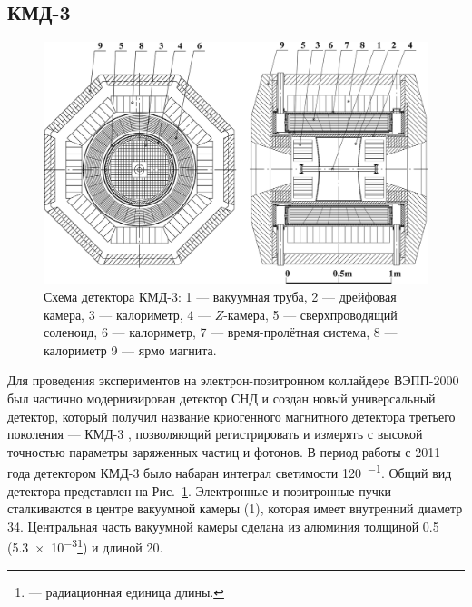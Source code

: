 \subsection{КМД-3}
\label{sec:cmd3}

\begin{figure}[htbp]
    \centering
    \includegraphics[width = .9\textwidth]{img/cmd3_detector/cmd3_layout.jpeg}
    \caption{Схема детектора КМД-3:
    	1 --- вакуумная труба,
    	2 --- дрейфовая камера,
    	3 ---  калориметр,
    	4 --- $Z$-камера,
    	5 --- сверхпроводящий соленоид,
    	6 ---  калориметр,
    	7 --- время-пролётная система,
    	8 ---  калориметр
    	9 --- ярмо магнита.
    }
    \label{fig:cmd3}
\end{figure}


Для проведения экспериментов на электрон-позитронном коллайдере \mbox{ВЭПП-2000} был частично модернизирован детектор СНД и создан новый универсальный детектор,
который получил название криогенного магнитного детектора третьего поколения
---
КМД-3 \cite{Khazin2010},
позволяющий регистрировать и измерять с высокой точностью параметры заряженных частиц и фотонов.
В период работы с 2011 года детектором КМД-3 было набаран интеграл светимости \SI{120}{\pbarnr^{-1}}.
Общий вид детектора представлен на Рис.~\ref{fig:cmd3}.
Электронные и позитронные пучки сталкиваются в центре вакуумной камеры (1), которая имеет внутренний диаметр \SI{34}{\mmr}. 
Центральная часть вакуумной камеры сделана из алюминия толщиной \SI{0.5}{\mmr} (\SI{5.3e-3}{\Xrad}\footnote{\si{\Xrad} --- радиационная единица длины.}) и длиной \SI{20}{\cmr}.

